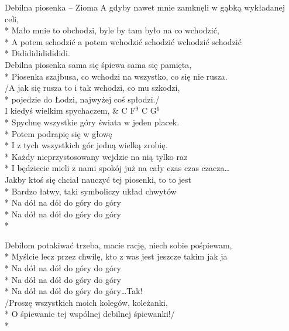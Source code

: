 \begin{piosenka_dluga}[-10mm]{Debilna piosenka -- Zioma}
A gdyby nawet mnie zamknęli w gąbką wykładanej celi, \\*
Mało mnie to obchodzi, byle by tam było na co wchodzić, \\*
A potem schodzić a potem wchodzić schodzić wchodzić schodzić \\*
Didididididididi. \\[\zwrotkaspace]

Debilna piosenka sama się śpiewa sama się pamięta, \\*
Piosenka szajbusa, co wchodzi na wszystko, co się nie rusza. \\[\zwrotkaspace]

/A jak się rusza to i tak wchodzi, co mu szkodzi, \\*
pojedzie do Łodzi, najwyżej coś spłodzi./ \\[\zwrotkaspace]

I kiedyś wielkim spychaczem, & C F$^9$ C G$^6$\\*
Spychnę wszystkie góry świata w jeden placek. \\*
Potem podrapię się w głowę \\*
I z tych wszystkich gór jedną wielką zrobię. \\*
Każdy nieprzystosowany wejdzie na nią tylko raz \\*
I będziecie mieli z nami spokój już na cały czas czas czacza\ldots \\[\zwrotkaspace]

Jakby ktoś się chciał nauczyć tej piosenki, to to jest \\*
Bardzo łatwy, taki symboliczy układ chwytów \\*
Na dół na dół do góry do góry  \\*
Na dół na dół do góry do góry \\*

Debilom potakiwać trzeba, macie rację, niech sobie pośpiewam, \\*
Myślcie lecz przez chwilę, kto z was jest jeszcze takim jak ja  \\*
Na dół na dół do góry do góry  \\*
Na dół na dół do góry do góry \\*
Na dół na dół do góry do góry\ldots Tak! \\[\zwrotkaspace]

/Proszę wszystkich moich kolegów, koleżanki, \\*
O śpiewanie tej wspólnej debilnej śpiewanki!/ \\*


\end{piosenka_dluga}
